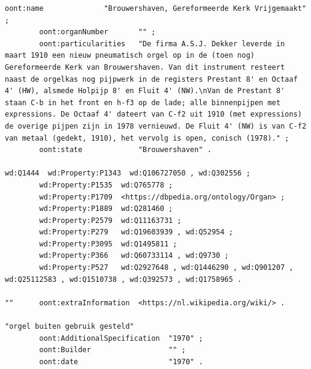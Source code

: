 \begin{lstlisting}[caption={Part14\_000Brouwershaven}]
        oont:name              "Brouwershaven, Gereformeerde Kerk Vrijgemaakt" ;
        oont:organNumber       "" ;
        oont:particularities   "De firma A.S.J. Dekker leverde in maart 1910 een nieuw pneumatisch orgel op in de (toen nog) Gereformeerde Kerk van Brouwershaven. Van dit instrument resteert naast de orgelkas nog pijpwerk in de registers Prestant 8' en Octaaf 4' (HW), alsmede Holpijp 8' en Fluit 4' (NW).\nVan de Prestant 8' staan C-b in het front en h-f3 op de lade; alle binnenpijpen met expressions. De Octaaf 4' dateert van C-f2 uit 1910 (met expressions) de overige pijpen zijn in 1978 vernieuwd. De Fluit 4' (NW) is van C-f2 van metaal (gedekt, 1910), het vervolg is open, conisch (1978)." ;
        oont:state             "Brouwershaven" .

wd:Q1444  wd:Property:P1343  wd:Q106727050 , wd:Q302556 ;
        wd:Property:P1535  wd:Q765778 ;
        wd:Property:P1709  <https://dbpedia.org/ontology/Organ> ;
        wd:Property:P1889  wd:Q281460 ;
        wd:Property:P2579  wd:Q11163731 ;
        wd:Property:P279   wd:Q19603939 , wd:Q52954 ;
        wd:Property:P3095  wd:Q1495811 ;
        wd:Property:P366   wd:Q60733114 , wd:Q9730 ;
        wd:Property:P527   wd:Q2927648 , wd:Q1446290 , wd:Q901207 , wd:Q25112583 , wd:Q1510738 , wd:Q392573 , wd:Q1758965 .

""      oont:extraInformation  <https://nl.wikipedia.org/wiki/> .

"orgel buiten gebruik gesteld"
        oont:AdditionalSpecification  "1970" ;
        oont:Builder                  "" ;
        oont:date                     "1970" .
\end{lstlisting} 


